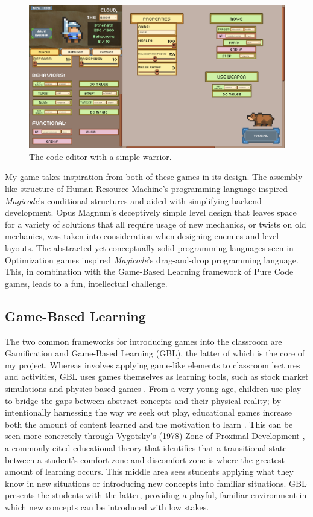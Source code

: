 \documentclass[10pt,twocolumn]{article}
\begin{document}
\begin{figure}
    \centering
    \includegraphics[width=\linewidth]{images/screenshots/cloud_editor.png}
    \caption{The code editor with a simple warrior.}
    \label{fig:code-editor-screenshot}
\end{figure}

My game takes inspiration from both of these games in its design. The assembly-like structure of Human Resource Machine’s programming language inspired \textit{Magicode}’s conditional structures and aided with simplifying backend development. Opus Magnum’s deceptively simple level design that leaves space for a variety of solutions that all require usage of new mechanics, or twists on old mechanics, was taken into consideration when designing enemies and level layouts. The abstracted yet conceptually solid programming languages seen in Optimization games inspired \textit{Magicode}'s drag-and-drop programming language. This, in combination with the Game-Based Learning framework of Pure Code games, leads to a fun, intellectual challenge.

\subsection{Game-Based Learning}
The two common frameworks for introducing games into the classroom are Gamification and Game-Based Learning (GBL), the latter of which is the core of my project. Whereas involves applying game-like elements to classroom lectures and activities, GBL uses games themselves as learning tools, such as stock market simulations and physics-based games \cite{gbl-waterloo}. From a very young age, children use play to bridge the gaps between abstract concepts and their physical reality; by intentionally harnessing the way we seek out play, educational games increase both the amount of content learned and the motivation to learn \cite{foundations-gbl}. This can be seen more concretely through Vygotsky’s (1978) Zone of Proximal Development \cite{vygotsky}, a commonly cited educational theory that identifies that a transitional state between a student’s comfort zone and discomfort zone is where the greatest amount of learning occurs. This middle area sees students applying what they know in new situations or introducing new concepts into familiar situations. GBL presents the students with the latter, providing a playful, familiar environment in which new concepts can be introduced with low stakes.
\end{document}
